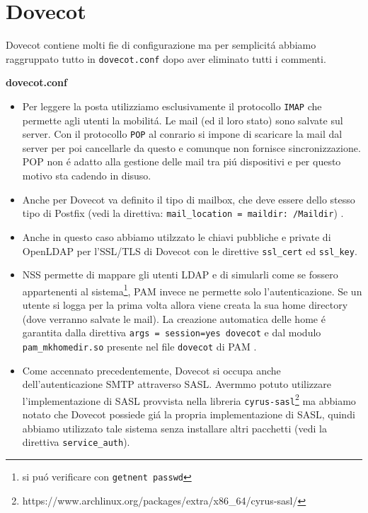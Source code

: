 \documentclass[9pt, a4paper, oneside]{article}
\begin{document}
		\section{Dovecot}
			\par
				Dovecot contiene molti fie di configurazione ma 
				per semplicit\'a abbiamo raggruppato tutto in 
				\texttt{dovecot.conf} dopo aver eliminato 
				tutti i commenti.
			\par
				\textbf{dovecot.conf}
				\begin{itemize}
					\item
						Per leggere la posta 
						utilizziamo esclusivamente il 
						protocollo \texttt{IMAP} che 
						permette agli utenti la 
						mobilit\'a. Le mail (ed il 
						loro stato) sono salvate sul 
						server. Con il 
						protocollo \texttt{POP} al 
						conrario si impone 
						di scaricare la mail dal server 
						per poi cancellarle da questo e 
						comunque non fornisce 
						sincronizzazione. POP non \'e 
						adatto alla gestione delle 
						mail tra pi\'u dispositivi e 
						per questo motivo sta cadendo 
						in disuso.
					\item
						Anche per Dovecot va definito 
						il tipo di mailbox, che deve 
						essere dello stesso tipo di 
						Postfix (vedi la direttiva:
						\texttt{mail\_location = maildir:~/Maildir})
						.
					\item
						Anche in questo caso abbiamo  
						utilzzato le chiavi pubbliche 
						e private di OpenLDAP per 
						l'SSL/TLS di Dovecot con le 
						direttive \texttt{ssl\_cert} ed 
						\texttt{ssl\_key}.
					\item
						NSS permette di mappare gli 
						utenti LDAP e di simularli 
						come se fossero appartenenti al 
						sistema\footnote{si pu\'o 
						verificare con 
						\texttt{getnent passwd}}, 
						PAM invece ne permette solo
						l'autenticazione. Se un utente 
						si logga per la prima volta 
						allora viene creata la sua home 
						directory (dove verranno 
						salvate le mail).
						La creazione automatica delle 
						home \'e garantita dalla 
						direttiva 
						\texttt{args = session=yes 
						dovecot} e dal modulo 
						\texttt{pam\_mkhomedir.so} 
						presente nel file 
						\texttt{dovecot} di PAM
						.
					\item
						Come accennato precedentemente, 
						Dovecot si occupa anche 
						dell'autenticazione SMTP 
						attraverso SASL. Avermmo potuto 
						utilizzare l'implementazione di 
						SASL provvista nella libreria 
						\texttt{cyrus-sasl}\footnote{https://www.archlinux.org/packages/extra/x86\_64/cyrus-sasl/} 
						ma abbiamo 
						notato che Dovecot possiede 
						gi\'a la propria 
						implementazione di SASL, quindi 
						abbiamo utilizzato tale 
						sistema senza installare altri 
						pacchetti (vedi la direttiva 
						\texttt{service\_auth}).
				\end{itemize}
\end{document}
